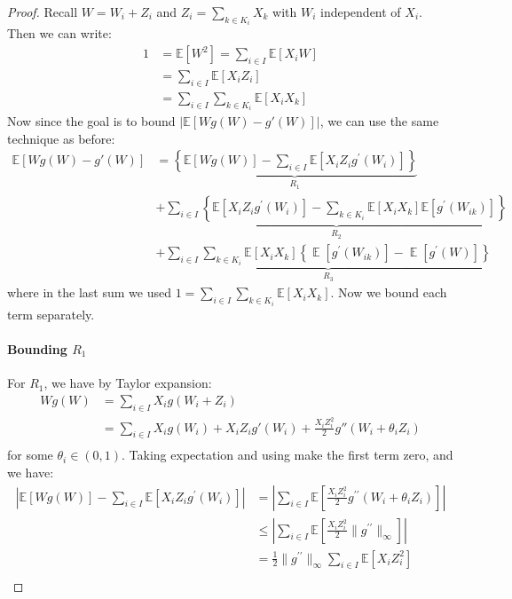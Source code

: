\documentclass{article}
\begin{document}
\begin{proof}
    Recall $W = W_i + Z_i$ and $Z_i = \sum_{k\in K_i} X_k$ with $W_i$ independent of $X_i$. Then we can write:
    \begin{align*}
        1 &= \mathbb{E}[W^2] = \sum_{i\in I} \mathbb{E}[X_i W] \\
        &= \sum_{i\in I} \mathbb{E}[X_i Z_i] \\
        &= \sum_{i\in I}\sum_{k\in K_i} \mathbb{E}[X_i X_k]
    \end{align*}
    Now since the goal is to bound $|\mathbb{E}[Wg(W)-g'(W)]|$, we can use the same technique as before:
    \begin{align*}
        \mathbb{E}[Wg(W)-g'(W)] &= \underbrace{\left\{\mathbb{E}[W g(W)]-\sum_{i\in I}\mathbb{E}[X_{i}Z_{i}g^{\prime}(W_{i})]\right\}}_{R_1} \\
        &+\underbrace{\sum_{i\in I}\left\{{\mathbb{E}}[X_{i}Z_{i}g^{\prime}(W_{i})]-\sum_{k\in K_{i}}{\mathbb{E}}[X_{i}X_{k}]{\mathbb{E}}[g^{\prime}(W_{i k})]\right\}}_{R_2}\\
        &+\underbrace{\sum_{i\in I}\sum_{k\in K_{i}}\mathbb{E}[X_{i}X_{k}]\left\{\operatorname{\mathbb{E}}[g^{\prime}(W_{i k})]-\operatorname{\mathbb{E}}[g^{\prime}(W)]\right\}}_{R_3}
    \end{align*}
    where in the last sum we used $1=\sum_{i\in I}\sum_{k\in K_i} \mathbb{E}[X_i X_k]$. Now we bound each term separately.


\paragraph{Bounding $R_1$} For $R_1$, we have by Taylor expansion:
\begin{align*}
    Wg(W) &= \sum_{i\in I} X_i g(W_i + Z_i)\\
    &= \sum_{i\in I} X_i g(W_i) + X_i Z_i g'(W_i) + \frac{X_i Z_i^2}{2} g''(W_i + \theta_i Z_i)\\
\end{align*}
for some $\theta_i \in (0,1)$. Taking expectation and using  make the first term zero, and we have:
\begin{align*}
    \left|\mathbb{E}[W g(W)]-\sum_{i\in I}\mathbb{E}[X_{i}Z_{i}g^{\prime}(W_{i})]\right| &= \left|\sum_{i\in I}\mathbb{E}\left[\frac{X_{i}Z_{i}^{2}}{2}g^{\prime \prime}\left(W_{i}+\theta_{i} Z_{i}\right)\right]\right|\\
    &\leq \left|\sum_{i\in I}\mathbb{E}\left[\frac{X_{i}Z_{i}^{2}}{2}\|g^{\prime \prime}\|_{\infty}\right]\right|\\
    &=\frac{1}{2} \|g^{\prime \prime}\|_{\infty} \sum_{i\in I}\mathbb{E}\left[X_{i} Z_{i}^{2}\right]\\
\end{align*}


\end{proof}
\end{document}
